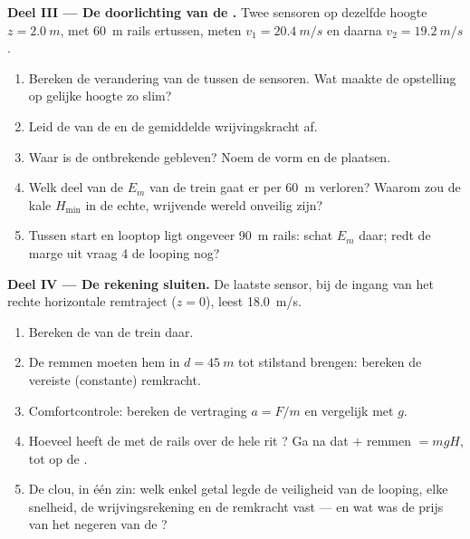\begin{problem}
\medskip
\noindent\textbf{Deel III --- De doorlichting van de .}
Twee sensoren op dezelfde hoogte $z = \qty{2.0}{m}$, met \qty{60}{m}
rails ertussen, meten $v_1 = \qty{20.4}{m/s}$ en daarna
$v_2 = \qty{19.2}{m/s}$.
\begin{enumerate}[resume]
  \item Bereken de verandering van de  tussen de
        sensoren. Wat maakte de opstelling op gelijke hoogte zo slim?
  \item Leid de  van de  en de gemiddelde wrijvingskracht
        af.
  \item Waar is de ontbrekende  gebleven? Noem de vorm en de
        plaatsen.
  \item Welk deel van de $E_m$ van de trein gaat er per \qty{60}{m}
        verloren? Waarom zou de kale $H_{\min}$ in de echte, wrijvende
        wereld onveilig zijn?
  \item Tussen start en looptop ligt ongeveer \qty{90}{m} rails: schat
        $E_m$ daar; redt de marge uit vraag 4 de looping nog?
\end{enumerate}

\medskip
\noindent\textbf{Deel IV --- De rekening sluiten.}
De laatste sensor, bij de ingang van het rechte horizontale remtraject
($z = 0$), leest \qty{18.0}{m/s}.
\begin{enumerate}[resume]
  \item Bereken de  van de trein daar.
  \item De remmen moeten hem in $d = \qty{45}{m}$ tot stilstand brengen:
        bereken de vereiste (constante) remkracht.
  \item Comfortcontrole: bereken de vertraging $a = F/m$ en vergelijk met
        $g$.
  \item Hoeveel  heeft de  met de rails over de hele rit
        ? Ga na dat  $+$ remmen $= mgH$, tot op de
        .
  \item De clou, in één zin: welk enkel getal legde de veiligheid van de
        looping, elke snelheid, de wrijvingsrekening en de remkracht
        vast --- en wat was de prijs van het negeren van de ?
\end{enumerate}
\end{problem}
